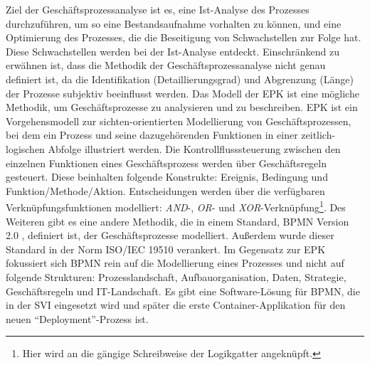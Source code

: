 Ziel der Geschäftsprozessanalyse ist es, eine Ist-Analyse des Prozesses durchzuführen, um so eine Bestandsaufnahme vorhalten zu können, und eine Optimierung des Prozesses, die die Beseitigung von Schwachstellen zur Folge hat. Diese Schwachstellen werden bei der Ist-Analyse entdeckt. Einschränkend zu erwähnen ist, dass die Methodik der Geschäftsprozessanalyse nicht genau definiert ist, da die Identifikation (Detaillierungsgrad) und Abgrenzung (Länge) der Prozesse subjektiv beeinflusst werden. Das Modell der \ac{EPK} ist eine mögliche Methodik, um Geschäftsprozesse zu analysieren und zu beschreiben.\autocite[vgl.][S.\,59]{staud_geschaftsprozessanalyse_2006} \ac{EPK} ist ein Vorgehensmodell zur sichten-orientierten Modellierung von Geschäftsprozessen, bei dem ein Prozess und seine dazugehörenden Funktionen in einer zeitlich-logischen Abfolge illustriert werden.\autocite[vgl.][S.\,4]{scheer_objektorientierte_1997} Die Kontrollflusssteuerung zwischen den einzelnen Funktionen eines Geschäftsprozess werden über Geschäftsregeln gesteuert. Diese beinhalten folgende Konstrukte: Ereignis, Bedingung und Funktion/Methode/Aktion. Entscheidungen werden über die verfügbaren Verknüpfungsfunktionen modelliert:\autocite[vgl.][S.\,4]{scheer_objektorientierte_1997} \textit{AND}-, \textit{OR}- und \textit{XOR}-Verknüpfung\footnote{Hier wird an die gängige Schreibweise der Logikgatter angeknüpft.}. Des Weiteren gibt es eine andere Methodik, die in einem Standard, \ac{BPMN} Version 2.0 \autocite{object_management_group_omg_business_2011}, definiert ist, der Geschäftsprozesse modelliert. Außerdem wurde dieser Standard in der Norm ISO/IEC 19510 verankert.\autocite{ict1_information_2020} Im Gegensatz zur \ac{EPK} fokussiert sich \ac{BPMN} rein auf die Modellierung eines Prozesses und nicht auf folgende Strukturen: Prozesslandschaft, Aufbauorganisation, Daten, Strategie, Geschäftsregeln und IT-Landschaft.\autocite[vgl.][S.\,28]{freund_praxishandbuch_2017} Es gibt eine Software-Lösung für \ac{BPMN}, die in der \ac{SVI} eingesetzt wird und später die erste Container-Applikation für den neuen \enquote{Deployment}-Prozess ist.


